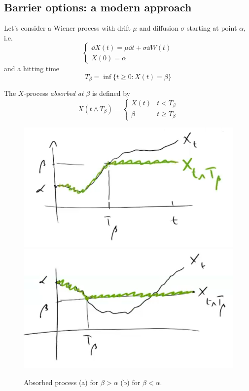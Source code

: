 \subsection{Barrier options: a modern approach} %
Let's consider a Wiener process with drift $\mu$ and diffusion $\sigma$ starting at point $\alpha$, i.e.
\begin{equation}
    \begin{cases}
    \dd X(t) = \mu \dd t + \sigma \dd W(t) \\
    X(0) = \alpha
    \end{cases}
\end{equation}
and a hitting time 
\begin{equation}
    T_{\beta} = \inf\{t\ge0:X(t)=\beta\}
\end{equation}
\begin{definition}
    The $X$-process \emph{absorbed at} $\beta$ is defined by
    \begin{equation}
        X(t\wedge T_{\beta}) = \begin{cases}
        X(t) & t < T_{\beta} \\
        \beta & t \ge T_{\beta}
        \end{cases}
    \end{equation}
\end{definition}
\begin{figure}[h]
    \centering
    \includegraphics[scale=0.25]{fig/tmp/fig37.png}
    \includegraphics[scale=0.25]{fig/tmp/fig38.png}
    \caption{Absorbed process (a) for $\beta>\alpha$ (b) for $\beta<\alpha$.}
    \label{fig:absproc}
\end{figure}
